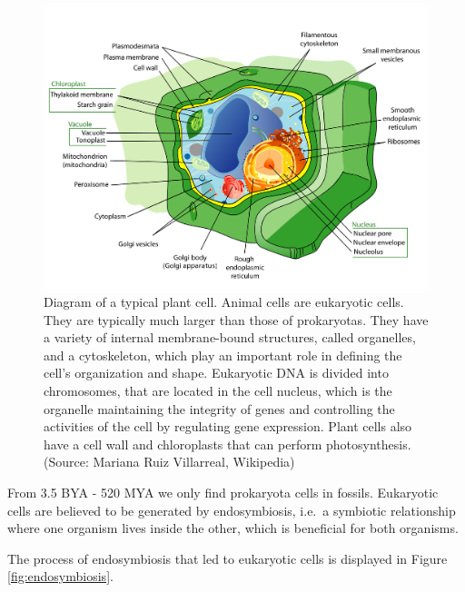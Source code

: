 \documentclass[
  11pt,
]{book}
\begin{document}
\begin{figure}

{\centering \includegraphics[width=0.5\linewidth]{./figs/plantCell} 

}

\caption{Diagram of a typical plant cell. Animal cells are eukaryotic cells. They are typically much larger than those of prokaryotas. They have a variety of internal membrane-bound structures, called organelles, and a cytoskeleton, which play an important role in defining the cell's organization and shape. Eukaryotic DNA is divided into chromosomes, that are located in the cell nucleus, which is the organelle maintaining the integrity of genes and controlling the activities of the cell by regulating gene expression. Plant cells also have a cell wall and chloroplasts that can perform photosynthesis. (Source: Mariana Ruiz Villarreal, Wikipedia)}\label{fig:plantCell}
\end{figure}

From 3.5 BYA - 520 MYA we only find prokaryota cells in fossils.
Eukaryotic cells are believed to be generated by endosymbiosis, i.e.~a symbiotic relationship where one organism lives inside the other, which is beneficial for both organisms.

The process of endosymbiosis that led to eukaryotic cells is displayed in Figure \ref{fig:endosymbiosis}.
\end{document}
